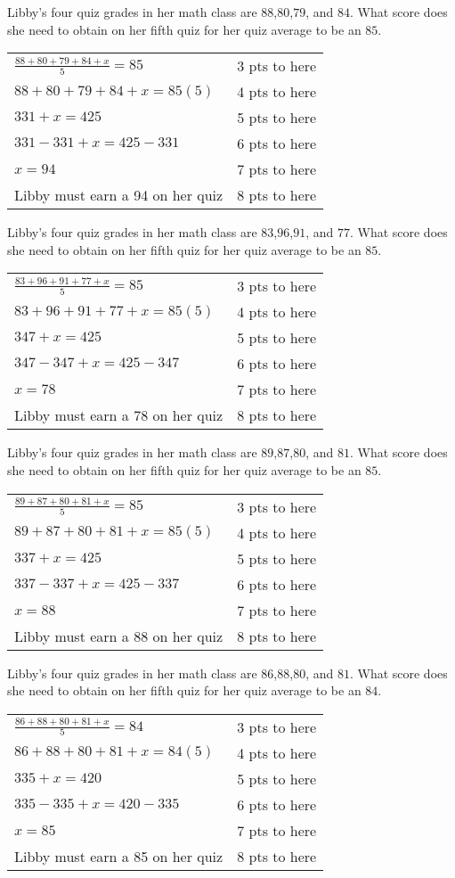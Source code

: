 {
	Libby's four quiz grades in her math class are $88$,$80$,$79$, and $84$. What score does she need to obtain on her fifth quiz for her quiz average to be an $85$.
}
{
	\begin{tabular}{l r}
	$\frac{88+80+79+84+x}{5}=85$ & 3 pts to here\\
	$88+80+79+84+x=85(5)$ & 4 pts to here\\
	$331+x=425$ & 5 pts to here\\
	$331-331+x=425-331$ & 6 pts to here\\
	$x=94$ & 7 pts to here\\
	Libby must earn a 94 on her quiz & 8 pts to here
	\end{tabular}
}

{
	Libby's four quiz grades in her math class are $83$,$96$,$91$, and $77$. What score does she need to obtain on her fifth quiz for her quiz average to be an $85$.
}
{
	\begin{tabular}{l r}
	$\frac{83+96+91+77+x}{5}=85$ & 3 pts to here\\
	$83+96+91+77+x=85(5)$ & 4 pts to here\\
	$347+x=425$ & 5 pts to here\\
	$347-347+x=425-347$ & 6 pts to here\\
	$x=78$ & 7 pts to here\\
	Libby must earn a 78 on her quiz & 8 pts to here
	\end{tabular}
}

{
	Libby's four quiz grades in her math class are $89$,$87$,$80$, and $81$. What score does she need to obtain on her fifth quiz for her quiz average to be an $85$.
}
{
	\begin{tabular}{l r}
	$\frac{89+87+80+81+x}{5}=85$ & 3 pts to here\\
	$89+87+80+81+x=85(5)$ & 4 pts to here\\
	$337+x=425$ & 5 pts to here\\
	$337-337+x=425-337$ & 6 pts to here\\
	$x=88$ & 7 pts to here\\
	Libby must earn a 88 on her quiz & 8 pts to here
	\end{tabular}
}

{
	Libby's four quiz grades in her math class are $86$,$88$,$80$, and $81$. What score does she need to obtain on her fifth quiz for her quiz average to be an $84$.
}
{
	\begin{tabular}{l r}
	$\frac{86+88+80+81+x}{5}=84$ & 3 pts to here\\
	$86+88+80+81+x=84(5)$ & 4 pts to here\\
	$335+x=420$ & 5 pts to here\\
	$335-335+x=420-335$ & 6 pts to here\\
	$x=85$ & 7 pts to here\\
	Libby must earn a 85 on her quiz & 8 pts to here
	\end{tabular}
}
